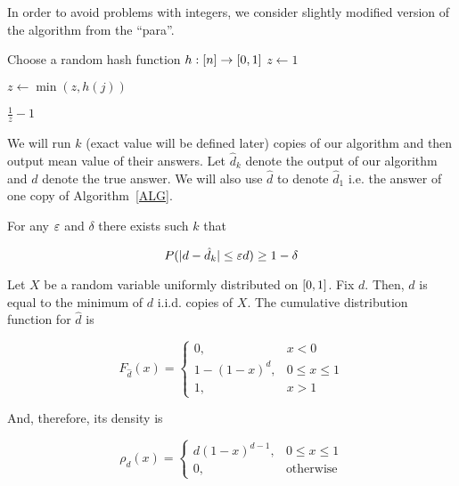 In order to avoid problems with integers, we consider slightly modified version of the algorithm from the ``para''.

\begin{algorithm}
	\caption{}\label{ALG}
	\begin{algorithmic}[1]
			\State Choose a random hash function $h: [n] \to [0, 1]$
			\State $z \gets 1$
		\EndProcedure

			\State $z \gets \min(z, h(j))$
		\EndProcedure

			\State \Return $\frac{1}{z} - 1$
		\EndProcedure
	\end{algorithmic}
\end{algorithm}

We will run $k$ (exact value will be defined later) copies of our algorithm and then output mean value of their answers. Let $\hat d_k$ denote the output of our algorithm and $d$ denote the true answer. We will also use $\hat d$ to denote $\hat d_1$ i.e. the answer of one copy of Algorithm~\ref{ALG}.

\begin{claim}\label{Main}
	For any $\varepsilon$ and $\delta$ there exists such $k$ that

	\begin{equation*}
		P(\lvert d - \hat d_k\rvert \leq \varepsilon d) \geq 1 - \delta
	\end{equation*}
\end{claim}

Let $X$ be a random variable uniformly distributed on $[0, 1]$. Fix $d$. Then, $\hat d$ is equal to the minimum of $d$ i.i.d. copies of $X$. The cumulative distribution function for $\hat d$ is

\begin{equation*}
	F_{\hat d}(x) = 
		\begin{cases}
			0, & x < 0 \\
			1 - (1 - x)^d, & 0 \leq x \leq 1 \\
			1, & x > 1
		\end{cases}
\end{equation*}

And, therefore, its density is

\begin{equation*}
	\rho_{\hat d}(x) = 
		\begin{cases}
			d (1 - x)^{d - 1}, & 0 \leq x \leq 1 \\
			0, & \text{otherwise}
		\end{cases}
\end{equation*}


